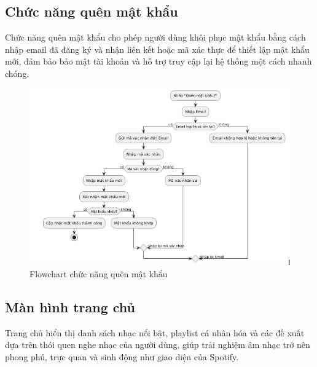 \subsection{Chức năng quên mật khẩu}
\label{subsec:quen-mat-khau}

Chức năng quên mật khẩu cho phép người dùng khôi phục mật khẩu bằng cách nhập email đã đăng ký và nhận liên kết hoặc mã xác thực để thiết lập mật khẩu mới, đảm bảo bảo mật tài khoản và hỗ trợ truy cập lại hệ thống một cách nhanh chóng.

\begin{figure}
    \centering
    \includegraphics[width=1\linewidth]{images/flowchart-quen-mat-khau.png}
    \caption{Flowchart chức năng quên mật khẩu}
    \label{fig:flowchart-quen-mat-khau}
\end{figure}

\subsection{Màn hình trang chủ}
\label{subsec:trang-chu}

Trang chủ hiển thị danh sách nhạc nổi bật, playlist cá nhân hóa và các đề xuất dựa trên thói quen nghe nhạc của người dùng, giúp trải nghiệm âm nhạc trở nên phong phú, trực quan và sinh động như giao diện của Spotify.

